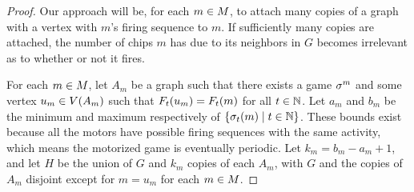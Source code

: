 \begin{proof}
Our approach will be, for each $m \in \mots$, to attach many copies of a graph
with a vertex with $m$'s firing sequence to $m$. If sufficiently many copies
are attached, the number of chips $m$ has due to its neighbors in $G$ becomes
irrelevant as to whether or not it fires.

For each $m \in \mots$, let $A_m$ be a graph such that there exists a game
$\s^m$ and some vertex $u _m\in \V[A_m]$ such that $\firing[\s^m]{u_m}{t} =
\firing{m}{t}$ for all $t \in \nats$. Let $a_m$ and $b_m$ be the minimum and
maximum respectively of $\set{\chips{m}{t}}{t \in \nats}$. These bounds exist
because all the motors have possible firing sequences with the same activity,
which means the motorized game is eventually periodic. Let $k_m = b_m - a_m +
1$, and let $H$ be the union of $G$ and $k_m$ copies of each $A_m$, with $G$
and the copies of $A_m$ disjoint except for $m = u_m$ for each $m \in \mots$.


\end{proof}
